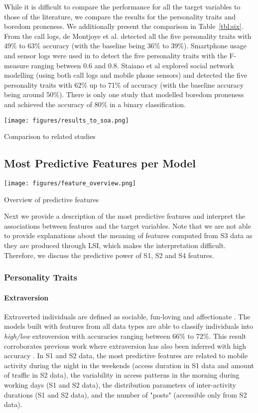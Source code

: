 While it is difficult to compare the performance for all the target variables to those of the literature, we compare the results for the personality traits and boredom proneness. We additionally present the comparison in Table~\ref{tbl:six}. From the call logs, de Montjoye et al. \cite{de2013predicting} detected all the five personality traits with 49\% to 63\% accuracy (with the baseline being 36\% to 39\%). Smartphone usage and sensor logs were used in \cite{chittaranjan2013mining} to detect the five personality traits with the F-measure ranging between 0.6 and 0.8. Staiano et al \cite{staiano2012friends} explored social network modelling (using both call logs and mobile phone sensors) and detected the five personality traits with 62\% up to 71\% of accuracy (with the baseline accuracy being around 50\%). There is only one study that modelled boredom proneness \cite{matic2015boredom} and achieved the accuracy of 80\% in a binary classification.

\begin{table}
  \texttt{[image: figures/results\_to\_soa.png]}
  \caption{Comparison to related studies}
  \label{tbl:six}
\end{table}

\subsection{Most Predictive Features per Model}
\begin{table}
  \texttt{[image: figures/feature\_overview.png]}
  \caption{Overview of predictive features}
  \label{tbl:seven}
\end{table}
Next we provide a description of the most predictive features and interpret the associations between features and the target variables. Note that we are not able to provide explanations about the meaning of features computed from S3 data as they are produced through LSI, which makes the interpretation difficult. Therefore, we discuss the predictive power of S1, S2 and S4 features. 

\subsubsection{Personality Traits}
\paragraph{Extraversion} Extraverted individuals are defined as sociable, fun-loving and affectionate \cite{goldberg2006international}. The models built with features from all data types are able to classify individuals into \textit{high/low} extroversion with accuracies ranging between 66\% to 72\%. This result corroborates previous work where extraversion has also been inferred with high accuracy \cite{de2013predicting, staiano2014money}. In S1 and S2 data, the most predictive features are related to mobile activity during the night in the weekends (access duration in S1 data and amount of traffic in S2 data), the variability in access patterns in the morning during working days (S1 and S2 data), the distribution parameters of inter-activity durations (S1 and S2 data), and the number of "posts" (accessible only from S2 data). 

